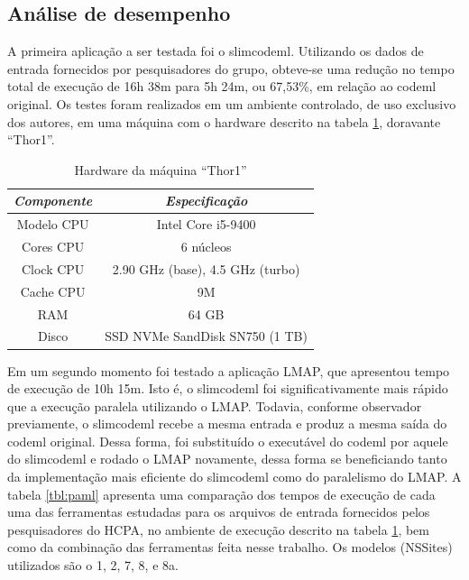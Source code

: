 \documentclass[cic,tc]{iiufrgs}
\begin{document}
\subsection{Análise de desempenho}

A primeira aplicação a ser testada foi o
slimcodeml.\cite{schabauer2012slimcodeml} Utilizando os dados de entrada
fornecidos por pesquisadores do grupo, obteve-se uma redução no tempo total de
execução de 16h 38m para 5h 24m, ou 67,53\%, em relação ao codeml original. Os
testes foram realizados em um ambiente controlado, de uso exclusivo dos
autores, em uma máquina com o hardware descrito na tabela \ref{tbl:thor1},
doravante ``Thor1''.

\begin{table}[h]
    \caption{Hardware da máquina ``Thor1''}
    \centering
        \begin{tabular}{c|c}
          \hline
          \textit{Componente}  &   \textit{Especificação} \\
          \hline
          \hline
          Modelo CPU & Intel Core i5-9400 \\
          Cores CPU & 6 núcleos\\
          Clock CPU & 2.90 GHz (base), 4.5 GHz (turbo) \\
          Cache CPU & 9M \\
          RAM & 64 GB \\
          Disco & SSD NVMe SandDisk SN750 (1 TB) \\
          \hline
        \end{tabular}
    \label{tbl:thor1}
\end{table}

Em um segundo momento foi testado a aplicação LMAP, que apresentou tempo de
execução de 10h 15m. Isto é, o slimcodeml foi significativamente mais rápido que
a execução paralela utilizando o LMAP. Todavia, conforme observador
previamente, o slimcodeml recebe a mesma entrada e produz a mesma saída do
codeml original. Dessa forma, foi substituído o executável do codeml por aquele
do slimcodeml e rodado o LMAP novamente, dessa forma se beneficiando tanto da
implementação mais eficiente do slimcodeml como do paralelismo do LMAP. A
tabela \ref{tbl:paml} apresenta uma comparação dos tempos de execução de cada
uma das ferramentas estudadas para os arquivos de entrada fornecidos pelos
pesquisadores do HCPA, no ambiente de execução descrito na tabela
\ref{tbl:thor1}, bem como da combinação das ferramentas feita nesse trabalho.
Os modelos (NSSites) utilizados são o 1, 2, 7, 8, e 8a.
\end{document}
